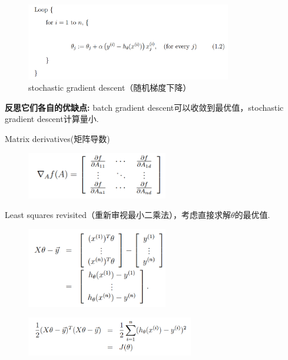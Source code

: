 \documentclass[12pt, a4paper, oneside]{ctexbook}
\begin{document}
  \begin{figure}[h]
		\centering 
		\includegraphics[width=0.8\textwidth]{images20.png} 
		\caption{stochastic gradient descent（随机梯度下降）}
	\end{figure}

\textbf{反思它们各自的优缺点:} batch gradient descent可以收敛到最优值，stochastic gradient descent计算量小.

\hspace*{\fill}

Matrix derivatives(矩阵导数)

  \begin{figure}[h]
		\centering 
		\includegraphics[width=0.55\textwidth]{images21.png} 
	\end{figure}

Least squares revisited（重新审视最小二乘法），考虑直接求解$\theta$的最优值.

  \begin{figure}[h]
		\centering 
		\includegraphics[width=0.55\textwidth]{images22.png} 
	\end{figure}

  \begin{figure}[h]
		\centering 
		\includegraphics[width=0.65\textwidth]{images23.png} 
	\end{figure}
\end{document}

